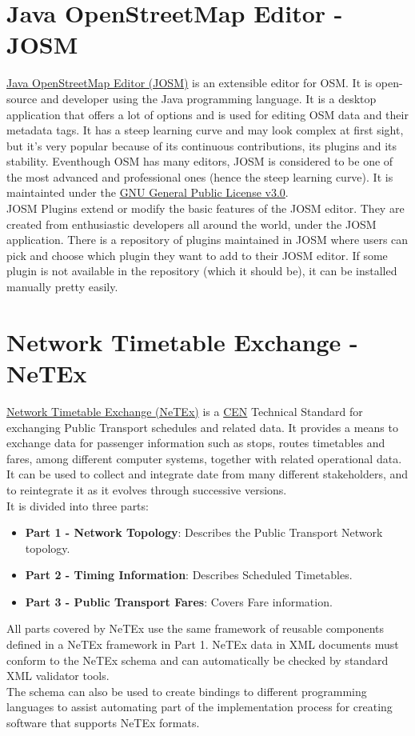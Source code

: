 \section{Java OpenStreetMap Editor - JOSM}
\href{https://josm.openstreetmap.de/}{Java OpenStreetMap Editor (JOSM)} is an extensible editor for OSM. It is open-source and developer using the Java programming language. It is a desktop application that offers a lot of options and is used for editing OSM data and their metadata tags. It has a steep learning curve and may look complex at first sight, but it's very popular because of its continuous contributions, its plugins and its stability. Eventhough OSM has many editors, JOSM is considered to be one of the most advanced and professional ones (hence the steep learning curve). It is maintainted under the \href{https://www.gnu.org/licenses/gpl-3.0.en.html}{GNU General Public License v3.0}.\\	
\newline
JOSM Plugins extend or modify the basic features of the JOSM editor. They are created from enthusiastic developers all around the world, under the JOSM application. There is a repository of plugins maintained in JOSM where users can pick and choose which plugin they want to add to their JOSM editor. If some plugin is not available in the repository (which it should be), it can be installed manually pretty easily.
\section{Network Timetable Exchange - NeTEx}
\href{http://netex-cen.eu/}{Network Timetable Exchange (NeTEx)} is a \href{https://www.cen.eu/Pages/default.aspx}{CEN} Technical Standard for exchanging Public Transport schedules and related data. It provides a means to exchange data for passenger information such as stops, routes timetables and fares, among different computer systems, together with related operational data. It can be used to collect and integrate date from many different stakeholders, and to reintegrate it as  it evolves through successive versions. \cite{WhatIsNeTEx}\\
\newline
It is divided into three parts:
\begin{itemize}
	\item \textbf{Part 1 - Network Topology}: Describes the Public Transport Network topology.
	\item \textbf{Part 2 - Timing Information}: Describes Scheduled Timetables.
	\item \textbf{Part 3 - Public Transport Fares}: Covers Fare information.
\end{itemize}
All parts covered by NeTEx use the same framework of reusable components defined in a NeTEx framework in Part 1. NeTEx data in XML documents must conform to the NeTEx schema and can automatically be checked by standard XML validator tools. \\
The schema can also be used to create bindings to different programming languages to assist automating part of the implementation process for creating software that supports NeTEx formats. \cite{WhatIsNeTEx}